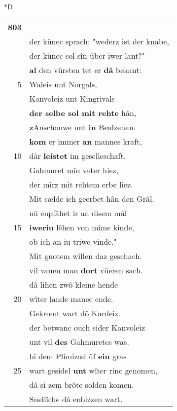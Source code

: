 \documentclass[8pt,a4paper,notitlepage]{article}
\begin{document}
\begin{table}[ht]
\begin{minipage}[t]{0.5\linewidth}
\small
\begin{center}*D
\end{center}
\begin{tabular}{rl}
\textbf{803} & \textbf{\begin{large}D\end{large}es gezeltes winden nam man} abe.\\ 
 & der künec sprach: "wederz ist der knabe,\\ 
 & der künec sol sîn über iwer lant?"\\ 
 & \textbf{al} den vürsten tet er \textbf{dâ} bekant:\\ 
5 & Waleis unt Norgals,\\ 
 & Kanvoleiz unt Kingrivals\\ 
 & \textbf{der selbe sol mit rehte} hân,\\ 
 & \textbf{z}Anschouwe unt \textbf{in} Bealzenan.\\ 
 & \textbf{kom} er immer \textbf{an} mannes kraft,\\ 
10 & dâr \textbf{leistet} im geselleschaft.\\ 
 & Gahmuret mîn vater hiez,\\ 
 & der mirz mit rehtem erbe liez.\\ 
 & Mit sælde ich geerbet hân den Grâl.\\ 
 & nû enpfâhet ir an disem mâl\\ 
15 & \textbf{iweriu} lêhen von mîme kinde,\\ 
 & ob ich an iu triwe vinde."\\ 
 & Mit guotem willen daz geschach.\\ 
 & vil vanen man \textbf{dort} vüeren sach.\\ 
 & dâ lihen zwô kleine hende\\ 
20 & wîter lande manec ende.\\ 
 & Gekrœnt wart dô Kardeiz.\\ 
 & der betwanc ouch sider Kanvoleiz\\ 
 & unt vil \textbf{des} Gahmuretes was.\\ 
 & bî dem Plimizœl ûf \textbf{ein} gras\\ 
25 & wart gesidel \textbf{unt} wîter rinc genomen,\\ 
 & dâ si zem brôte solden komen.\\ 
 & Snellîche dâ enbizzen wart.\\ 

\end{tabular}
\end{minipage}
\end{table}
\end{document}
